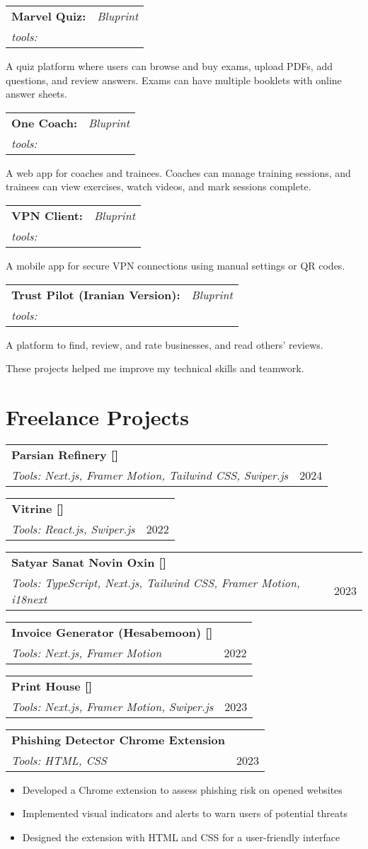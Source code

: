\documentclass[a4paper,11pt]{article}
\makeatletter
\newcommand{\resumeSubheading}[4]{
\vspace{0.5mm}\item
    \begin{tabular*}{0.98\textwidth}[t]{l@{\extracolsep{\fill}}r}
        \textbf{#1} & \textit{\footnotesize{#4}} \\
        \textit{\footnotesize{#3}} &  \footnotesize{#2}\\
    \end{tabular*}
    \vspace{-2.4mm}
}
\newcommand{\resumeItemListStart}{\begin{itemize}[leftmargin=*,labelsep=1mm,itemsep=0.5mm]}
\newcommand{\resumeItemListEnd}{\end{itemize}\vspace{-2mm}}
\makeatother
\begin{document}
\resumeSubheading {Marvel Quiz:} {}
{tools:}{Bluprint} 

  \item A quiz platform where users can browse and buy exams, upload PDFs, add questions, and review answers. Exams can have multiple booklets with online answer sheets.


\resumeSubheading {One Coach:} {}
{tools:}{Bluprint} 

  \item A web app for coaches and trainees. Coaches can manage training sessions, and trainees can view exercises, watch videos, and mark sessions complete.


\resumeSubheading {VPN Client:} {}
{tools:}{Bluprint} 

  \item A mobile app for secure VPN connections using manual settings or QR codes.


\resumeSubheading {Trust Pilot (Iranian Version):}{}
{tools:}{Bluprint} 
\item A platform to find, review, and rate businesses, and read others’ reviews.

 \vspace{6mm}
These projects helped me improve my technical skills and teamwork.




\vspace{6mm}

\section{\textbf{Freelance Projects}}
\vspace{-0.4mm}


\resumeSubheading
     {Parsian Refinery [\href{http://parsianrefinery.com}{\faIcon{globe}}]}{2024}
     {Tools: Next.js, Framer Motion, Tailwind CSS, Swiper.js}
     {}

 \resumeSubheading
  {Vitrine [\href{https://vitrin.semnan.ac.ir}{\faIcon{globe}}]}{2022}
  {Tools: React.js, Swiper.js}
{}
\resumeSubheading
    {Satyar Sanat Novin Oxin [\href{https://ssnoc.com/}{\faIcon{globe}}]}{2023}
    {Tools: TypeScript, Next.js, Tailwind CSS, Framer Motion, i18next}
    {}
 \resumeSubheading
  {Invoice Generator (Hesabemoon) [\href{https://hesabemoonv2.vercel.app/home}{\faIcon{globe}}]}{2022}
  {Tools: Next.js, Framer Motion}
{}
 \resumeSubheading
  {Print House [\href{https://print-house.vercel.app}{\faIcon{globe}}]}{2023}
  {Tools: Next.js, Framer Motion, Swiper.js}
  {}
 \resumeSubheading
  {Phishing Detector Chrome Extension}{2023}
  {Tools: HTML, CSS}
  {}
\resumeItemListStart
  \item Developed a Chrome extension to assess phishing risk on opened websites
  \item Implemented visual indicators and alerts to warn users of potential threats
  \item Designed the extension with HTML and CSS for a user-friendly interface
\resumeItemListEnd
\end{document}
